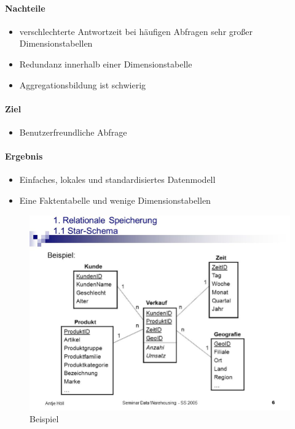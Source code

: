 \paragraph{Nachteile}
\begin{itemize}
    \item verschlechterte Antwortzeit bei häufigen Abfragen sehr großer Dimensionstabellen 
    \item Redundanz innerhalb einer Dimensionstabelle
    \item Aggregationsbildung ist schwierig
    
\end{itemize}

\paragraph{Ziel}
\begin{itemize}
    \item Benutzerfreundliche Abfrage 
\end{itemize}

\paragraph{Ergebnis}
\begin{itemize}
    \item Einfaches, lokales und standardisiertes Datenmodell
    \item Eine Faktentabelle und wenige Dimensionstabellen    
\end{itemize}

\begin{figure}[H]
    \centering
    \includegraphics[width=.8\textwidth]{Content/images/modellierung/star2.png}
    \caption{Beispiel}
    \label{fig:modellierung:star2}
\end{figure}

